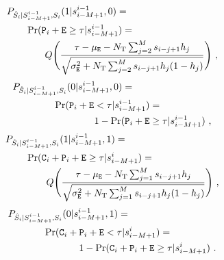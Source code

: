 \documentclass[journal]{IEEEtranTCOM}
\begin{document}
\begin{align}
\begin{split}
    &P_{\hat{S}_{i}|S_{i-M+1}^{i-1},S_{i}}(1|s_{i-M+1}^{i-1},0)= \\&\hspace{0.7cm}\Pr(\mathtt{P}_{i}+\mathtt{E} \geq\tau |s_{i-M+1}^{i-1}) = \\& \hspace{1.4cm} Q\Bigg(\frac{\tau-\mu_{\mathtt{E}}-N_{\mathrm{T}}\sum^{M}_{j=2}s_{i-j+1}h_{j}}{\sqrt{\sigma_{\mathtt{E}}^{2}+N_{\mathrm{T}}\sum^{M}_{j=2}s_{i-j+1}h_{j}(1-h_{j})}}\Bigg)~,
\end{split}
\end{align}
\begin{align}
\begin{split}
    &P_{\hat{S}_{i}|S_{i-M+1}^{i-1},S_{i}}(0|s_{i-M+1}^{i-1},0)=\\&\hspace{1.5cm} \Pr(\mathtt{P}_{i}+\mathtt{E} <\tau |s_{i-M+1}^{i-1} ) = \\&\hspace{3cm} 1-\Pr(\mathtt{P}_{i}+\mathtt{E} \geq\tau |s_{i-M+1}^{i-1})~,
\end{split}
\end{align}
\begin{align}
\begin{split}
    & P_{\hat{S}_{i}|S_{i-M+1}^{i-1},S_{i}}(1|s_{i-M+1}^{i-1},1) =\\&\hspace{0.75cm} \Pr(\mathtt{C}_{i}+\mathtt{P}_{i}+\mathtt{E} \geq\tau |s_{i-M+1}^{i}) =\\&\hspace{1.5cm} Q\Bigg(\frac{\tau-\mu_{\mathtt{E}}-N_{\mathrm{T}}\sum^{M}_{j=1}s_{i-j+1}h_{j}}{\sqrt{\sigma_{\mathtt{E}}^{2}+N_{\mathrm{T}}\sum^{M}_{j=1}s_{i-j+1}h_{j}(1-h_{j})}}\Bigg)~,
\end{split}
\end{align}
\begin{align}
\begin{split}
    & P_{\hat{S}_{i}|S_{i-M+1}^{i-1},S_{i}}(0|s_{i-M+1}^{i-1},1) =\\&\hspace{1.3cm} \Pr(\mathtt{C}_{i}+\mathtt{P}_{i}+\mathtt{E} <\tau |s_{i-M+1}^{i}) =\\&\hspace{2.6cm} 1 - \Pr(\mathtt{C}_{i}+\mathtt{P}_{i}+\mathtt{E} \geq\tau |s_{i-M+1}^{i})~.
\end{split}
\end{align}
\end{document}
